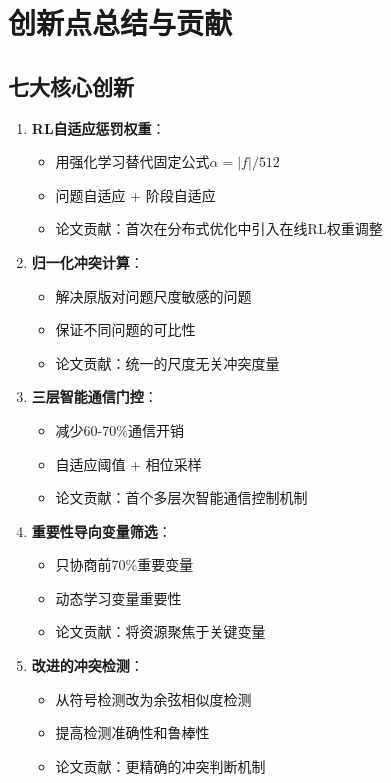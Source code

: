 \documentclass[15pt,a3paper]{ctexart}
\begin{document}
\section{创新点总结与贡献}

\subsection{七大核心创新}

\begin{enumerate}
    \item \textbf{RL自适应惩罚权重}：
    \begin{itemize}
        \item 用强化学习替代固定公式$\alpha = |f|/512$
        \item 问题自适应 + 阶段自适应
        \item 论文贡献：首次在分布式优化中引入在线RL权重调整
    \end{itemize}
    
    \item \textbf{归一化冲突计算}：
    \begin{itemize}
        \item 解决原版对问题尺度敏感的问题
        \item 保证不同问题的可比性
        \item 论文贡献：统一的尺度无关冲突度量
    \end{itemize}
    
    \item \textbf{三层智能通信门控}：
    \begin{itemize}
        \item 减少60-70\%通信开销
        \item 自适应阈值 + 相位采样
        \item 论文贡献：首个多层次智能通信控制机制
    \end{itemize}
    
    \item \textbf{重要性导向变量筛选}：
    \begin{itemize}
        \item 只协商前70\%重要变量
        \item 动态学习变量重要性
        \item 论文贡献：将资源聚焦于关键变量
    \end{itemize}
    
    \item \textbf{改进的冲突检测}：
    \begin{itemize}
        \item 从符号检测改为余弦相似度检测
        \item 提高检测准确性和鲁棒性
        \item 论文贡献：更精确的冲突判断机制
    \end{itemize}
    

\end{enumerate}
\end{document}
